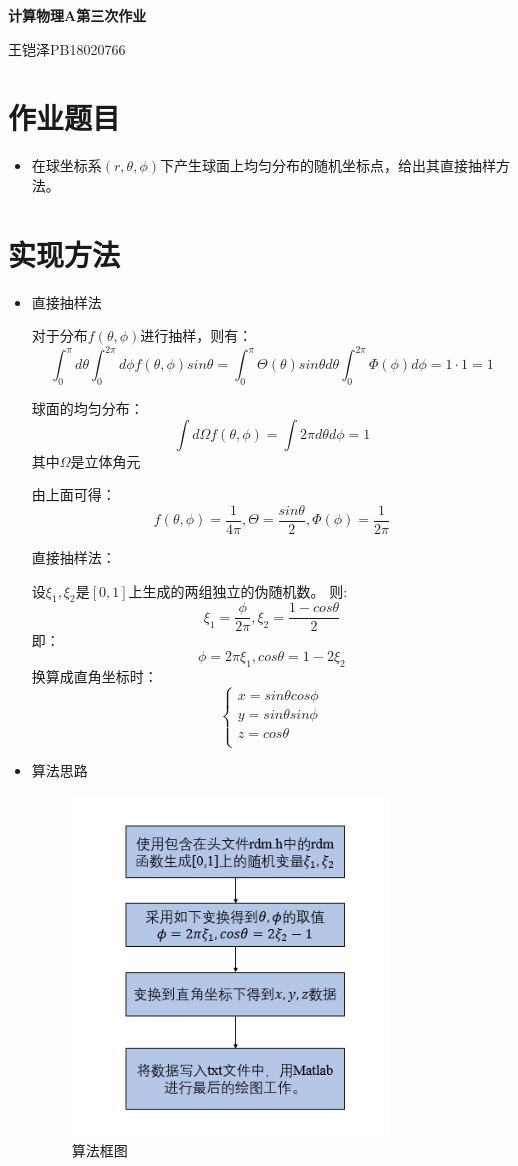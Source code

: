 \documentclass[hyperref,UTF8]{ctexart}
\begin{document}
	\centering\textbf{\LARGE{计算物理A第三次作业}}
	
	
	王铠泽\qquad PB18020766
	
		
	\section{作业题目}
	
	\begin{itemize}
		\item 在球坐标系$(r,\theta,\phi)$下产生球面上均匀分布的随机坐标点，给出其直接抽样方法。
	\end{itemize}
	
	\section{实现方法}
	
	\begin{itemize}
		\item 直接抽样法
		
		对于分布$f(\theta,\phi)$进行抽样，则有：
		$$\int_{0}^{\pi}d\theta\int_0^{2\pi}d\phi f(\theta,\phi)sin\theta =\int_{0}^{\pi}\Theta(\theta)sin\theta d\theta\int_0^{2\pi}\Phi(\phi)d\phi=1\cdot1=1$$
		
		球面的均匀分布：
		$$\int d\Omega f(\theta,\phi)=\int2\pi d\theta d\phi=1$$
		其中$\Omega$是立体角元		
		
		由上面可得：
		$$f(\theta,\phi)=\frac{1}{4\pi},\Theta=\frac{sin\theta}{2},\Phi(\phi)=\frac{1}{2\pi}$$
		
		直接抽样法：
		
		设$\xi_1,\xi_2$是$[0,1]$上生成的两组独立的伪随机数。
		则:
		$$\xi_1=\frac{\phi}{2\pi},\xi_2=\frac{1-cos\theta}{2}$$
		即：
		$$\phi=2\pi\xi_1,cos\theta=1-2\xi_2$$
		换算成直角坐标时：
	$$ \left\{
	\begin{array}{l}
	x=sin\theta cos\phi\\
	y=sin\theta sin\phi\\
	z=cos\theta\\
	\end{array} \right. $$
		\item 算法思路
			\begin{figure}[H]
				\centering
				\includegraphics[width=3.3in]{intro.png}
				\caption{算法框图}\label{fig:1}
			\end{figure}
		
	\end{itemize}
\end{document}
